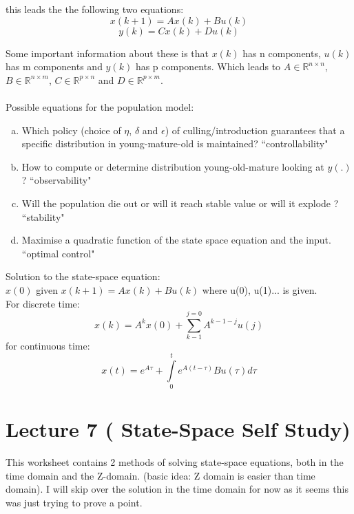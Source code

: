\documentclass[a4paper,11pt]{article}
\begin{document}
this leads the the following two equations:
\begin{equation}
	x(k+1) = A x(k) + Bu(k)
\end{equation}
\begin{equation}
	y(k) = C x(k) + Du(k)
\end{equation}

Some important information about these is that $x(k)$ has n components, $u(k)$ has m components and $y(k)$ has p components. Which leads to $A\in \mathbb{R}^{n\times n}$, $B\in \mathbb{R}^{n\times m}$, $C\in \mathbb{R}^{p\times n}$ and  $D\in \mathbb{R}^{p\times m}$.\\\\
Possible equations for the population model:
\begin{enumerate}[a)]
	\item Which policy (choice of $\eta$, $\delta$ and $\epsilon$) of culling/introduction guarantees that a specific distribution in young-mature-old is maintained? ``controllability"
	\item How to compute or determine distribution young-old-mature looking at $y(.)$? ``observability"
	\item Will the population die out or will it reach stable value or will it explode ? ``stability"
	\item Maximise a quadratic function of the state space equation and the input. ``optimal control"
\end{enumerate}

Solution to the state-space equation:\\
$x(0)$ given $x(k+1)= Ax(k)+Bu(k)$ where u(0), u(1)... is given.\\
For discrete time:
\begin{equation}
	x(k) = A^kx(0)+\sum\limits_{k-1}^{j=0}A^{k-1-j}u(j)    
\end{equation}
for continuous time:
\begin{equation}
	x(t) = e^{A\tau}+\int\limits_{0}^{t}e^{A(t-\tau)}Bu(\tau)d\tau    
\end{equation}
\section{Lecture 7 ( State-Space Self Study)}
This worksheet contains 2 methods of solving state-space equations, both in the time domain and the Z-domain. (basic idea: Z domain is easier than time domain). I will skip over the solution in the time domain for now as it seems this was just trying to prove a point.
\end{document}
